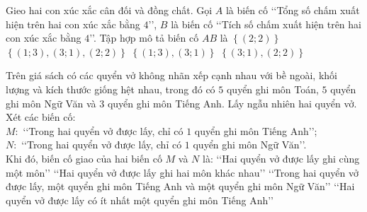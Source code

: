 

\begin{ex}%
	Gieo hai con xúc xắc cân đối và đồng chất. Gọi $A$ là biến cố \lq\lq Tổng số chấm xuất hiện trên hai con xúc xắc bằng $4$\rq\rq, $B$ là biến cố \lq\lq Tích số chấm xuất hiện trên hai con xúc xắc bằng  $4$\rq\rq. Tập hợp mô tả biến cố $AB$ là
	 \choice
		{\True $\left\{(2; 2)\right\}$} 
		{$\left\{(1; 3), (3; 1), (2; 2)\right\}$} 
		{$\left\{(1;  3), (3; 1)\right\}$}
		 {$\left\{(3; 1), (2; 2)\right\}$}
\end{ex}

\begin{ex}%
	Trên giá sách có  các quyển vở không nhãn xếp cạnh nhau với bề ngoài, khối lượng và kích thước giống hệt nhau, trong đó có $5$ quyển ghi môn Toán, $5$ quyển ghi môn Ngữ Văn và $3$ quyển ghi môn Tiếng Anh. Lấy ngẫu nhiên hai quyển vở. Xét các biến cố:\\
	$M\colon$ \lq\lq  Trong hai quyển vở được lấy, chỉ có $1$ quyển ghi môn Tiếng Anh\rq\rq;\\
	$N\colon$ \lq\lq Trong hai quyển vở được lấy, chỉ có $1$ quyển  ghi môn Ngữ Văn\rq\rq.\\
	Khi đó, biến cố giao của hai biến cố $M$  và $N$ là:
	 \choice
		{\lq\lq Hai quyển vở được lấy ghi  cùng một môn\rq\rq}
		{\lq\lq  Hai quyển vở được lấy ghi hai môn khác nhau\rq\rq}
		{ \True \lq\lq Trong hai quyển vở được lấy, một quyển  ghi môn Tiếng Anh và một quyển ghi môn Ngữ Văn\rq\rq}
		{\lq\lq Hai quyển vở  được lấy có ít nhất một quyển ghi môn Tiếng Anh\rq\rq}
\end{ex}


